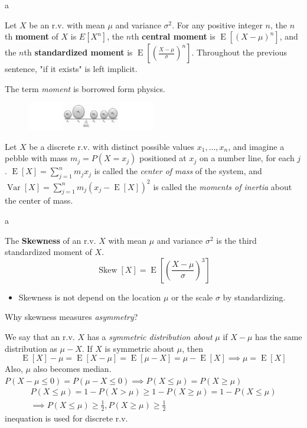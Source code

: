\documentclass[8pt]{beamer}
\newcommand{\tb}[1]{\textbf{#1}}
\newcommand{\ti}[1]{\textit{#1}}
\newcommand{\expec}[1]{\operatorname{E}\left[ #1 \right]}
\newcommand{\myvar}[1]{\operatorname{Var}\left[#1\right]}
\newcommand{\myskew}[1]{\operatorname{Skew}\!\left[#1\right]}
\begin{document}
\begin{frame}{a}
    \begin{definition}
        Let $X$ be an r.v. with mean $\mu$ and variance $\sigma^2$. For any positive integer $n$, the $n$th \tb{moment} of $X$ is $E[X^n]$, the $n$th \tb{central moment} is $\expec{(X-\mu)^n}$, and the $n$th \tb{standardized moment} is $\expec{\left(\frac{X-\mu}{\sigma}\right)^n}$. Throughout the previous sentence, "if it exists" is left implicit.
    \end{definition}

    \bigskip
    The term \ti{moment} is borrowed form physics.
    \begin{figure}
        \centering
        \includegraphics[width=0.5\textwidth]{fig2.png}
    \end{figure}
    Let $X$ be a discrete r.v. with distinct possible values $x_1, \dots, x_n$, and imagine a pebble with mass $m_j = P(X=x_j)$ positioned at $x_j$ on a number line, for each $j$.
    $\expec{X} = \sum_{j=1}^n m_j x_j$ is called the \ti{center of mass} of the system, and $\myvar{X} = \sum_{j=1}^n m_j (x_j - \expec{X})^2$ is called the \ti{moments of inertia} about the center of mass.

\end{frame}

\begin{frame}{a}
    \begin{definition}[Skewness]
        The \tb{Skewness} of an r.v. $X$ with mean $\mu$ and variance $\sigma^2$ is the third standardized moment of $X$.
        \[
            \myskew{X} = \expec{\left(\frac{X-\mu}{\sigma} \right)^3}
        \]
    \end{definition}
    \begin{itemize}
        \item Skewness is not depend on the location $\mu$ or the scale $\sigma$ by standardizing.
    \end{itemize}
    Why skewness measures \ti{asymmetry}?

    \begin{definition}[Symmetry of an r.v.]
        We say that an r.v. $X$ has a \ti{symmetric distribution about} $\mu$ if $X - \mu$ has the same distribution as $\mu - X$. If $X$ is symmetric about $\mu$, then
        \[
            \expec{X} - \mu = \expec{X - \mu} = \expec{\mu - X} = \mu - \expec{X} \implies \mu = \expec{X}
        \]
        Also, $\mu$ also becomes median. $P(X-\mu \leq 0) = P(\mu - X \leq 0) \implies P(X \leq \mu) = P(X \geq \mu)$
        \[
        \begin{gathered}
            P(X \leq \mu) = 1 - P(X > \mu) \geq 1 - P(X \geq \mu) = 1- P(X \leq \mu) \\
            \implies P(X \leq \mu) \geq \frac{1}{2}, P(X \geq \mu) \geq \frac{1}{2}
        \end{gathered}
        \]
        inequation is used for discrete r.v.
    \end{definition}
\end{frame}
\end{document}
